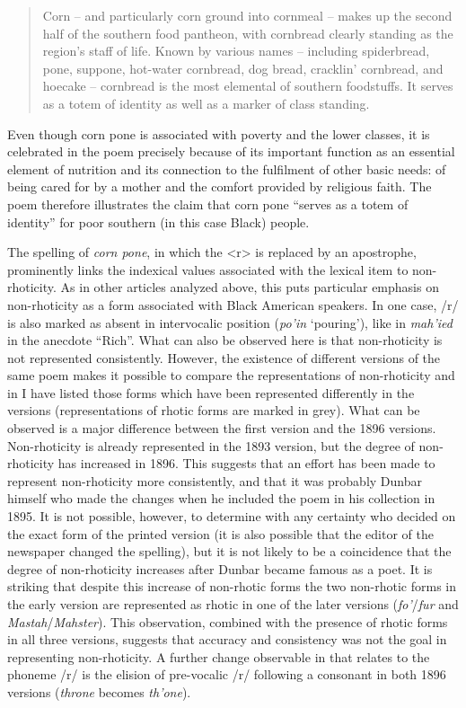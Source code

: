 \begin{quote}
Corn – and particularly corn ground into cornmeal – makes up the second half of the southern food pantheon, with cornbread clearly standing as the region’s staff of life. Known by various names – including spiderbread, pone, suppone, hot-water cornbread, dog bread, cracklin’ cornbread, and ho{\kern0pt}ecake – cornbread is the most elemental of southern foodstuffs. It serves as a totem of identity as well as a marker of class standing.
\end{quote}


Even though corn pone is associated with poverty and the lower classes, it is celebrated in the poem precisely because of its important function as an essential element of nutrition and its connection to the fulfilment of other basic needs: of being cared for by a mother and the comfort provided by religious faith. The poem therefore illustrates the claim that corn pone “serves as a totem of identity” for poor southern (in this case Black) people.



The spelling of \emph{corn pone}, in which the <r> is replaced by an apostrophe, prominently links the indexical values associated with the lexical item to non-rhoticity. As in other articles analyzed above, this puts particular emphasis on non-rhoticity as a form associated with Black American speakers. In one case, /r/ is also marked as absent in intervocalic position (\emph{po’in} ‘pouring’), like in \emph{mah’ied} in the anecdote “Rich”. What can also be observed here is that non-rhoticity is not represented consistently. However, the existence of different versions of the same poem makes it possible to compare the representations of non-rhoticity and in  I have listed those forms which have been represented differently in the versions (representations of rhotic forms are marked in grey). What can be observed is a major difference between the first version and the 1896 versions. Non-rhoticity is already represented in the 1893 version, but the degree of non-rhoticity has increased in 1896. This suggests that an effort has been made to represent non-rhoticity more consistently, and that it was probably Dunbar himself who made the changes when he included the poem in his collection in 1895. It is not possible, however, to determine with any certainty who decided on the exact form of the printed version (it is also possible that the editor of the newspaper changed the spelling), but it is not likely to be a coincidence that the degree of non-rhoticity increases after Dunbar became famous as a poet. It is striking that despite this increase of non-rhotic forms the two non-rhotic forms in the early version are represented as rhotic in one of the later versions (\emph{fo’}/\emph{fur} and \emph{Mastah}/\emph{Mahster}). This observation, combined with the presence of rhotic forms in all three versions, suggests that accuracy and consistency was not the goal in representing non-rhoticity. A further change observable in  that relates to the phoneme /r/ is the elision of pre-vocalic /r/ following a consonant in both 1896 versions (\emph{throne} becomes \emph{th’one}).


